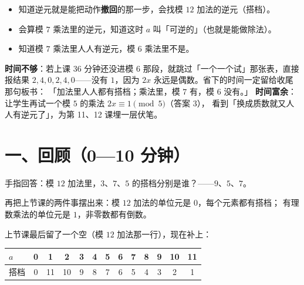 

\begin{mubiao}
  \begin{itemize}
    \item 知道逆元就是能把动作\textbf{撤回}的那一步，会找模 \(12\) 加法的逆元（搭档）。
    \item 会算模 \(7\) 乘法里的逆元，知道这时 \(a\) 叫「可逆的」（也就是能做除法）。
    \item 知道模 \(7\) 乘法里人人有逆元，模 \(6\) 乘法里不是。
  \end{itemize}
\end{mubiao}


\begin{beifen}
  \textbf{时间不够}：若上课 36 分钟还没进模 6 那段，就跳过「一个一个试」那张表，直接报结果
  \(2,4,0,2,4,0\)——没有 \(1\)，因为 \(2x\) 永远是偶数。省下的时间一定留给收尾那句板书：
  「加法里人人都有搭档；乘法里，模 \(7\) 有，模 \(6\) 没有。」
  \textbf{时间富余}：让学生再试一个模 \(5\) 的乘法 \(2x\equiv1\pmod5\)（答案 \(3\)），
  看到「换成质数就又人人有逆元了」，为第 11、12 课埋一层伏笔。
\end{beifen}

\section*{一、回顾（0—10 分钟）}

\begin{caozuo}
  手指回答：模 \(12\) 加法里，\(3\)、\(7\)、\(5\) 的搭档分别是谁？——\(9\)、\(5\)、\(7\)。
\end{caozuo}

再把上节课的两件事摆出来：模 \(12\) 加法的单位元是 \(0\)，每个元素都有搭档；
有理数乘法的单位元是 \(1\)，非零数都有倒数。

\noindent 上节课最后留了一个空（模 \(12\) 加法那一行），现在补上：

\begin{center}
{\small
\begin{tabular}{@{}l*{12}{c}@{}}
  \toprule
  \(a\) & 0 & 1 & 2 & 3 & 4 & 5 & 6 & 7 & 8 & 9 & 10 & 11 \\
  \midrule
  搭档 & 0 & 11 & 10 & 9 & 8 & 7 & 6 & 5 & 4 & 3 & 2 & 1 \\
  \bottomrule
\end{tabular}}
\end{center}

